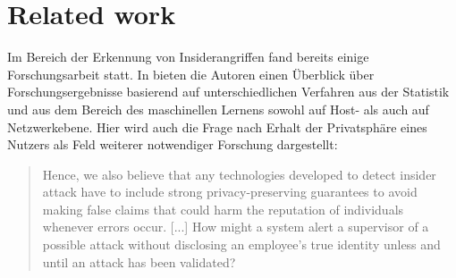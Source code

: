 \section*{Related work}
\label{related_work}


Im Bereich der Erkennung von Insiderangriffen fand bereits einige Forschungsarbeit statt. In \cite{salem2008survey} bieten die Autoren einen Überblick über Forschungsergebnisse basierend auf unterschiedlichen Verfahren aus der Statistik und aus dem Bereich des maschinellen Lernens sowohl auf Host- als auch auf Netzwerkebene. Hier wird auch die Frage nach Erhalt der Privatsphäre eines Nutzers als Feld weiterer notwendiger Forschung dargestellt:

\begin{quotation}
\glqq Hence, we also believe that any technologies developed
to detect insider attack have to include strong privacy-preserving guarantees
to avoid making false claims that could harm the reputation of individuals
whenever errors occur. [...] 
How might a system alert a supervisor of a possible attack without disclosing
an employee’s true identity unless and until an attack has been validated?\grqq{}
\cite{salem2008survey}
\end{quotation}




